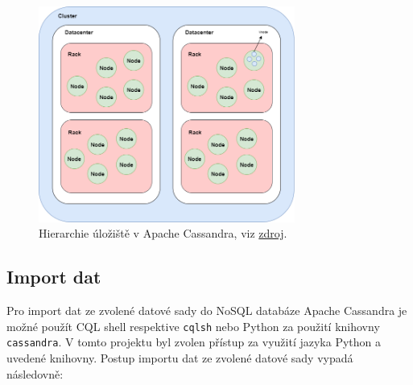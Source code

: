 \documentclass[a4paper, 11pt]{article}
\begin{document}
    \begin{figure}[ht!]
        \centering
        \includegraphics[width=0.75\textwidth]{img/cassandra_hierarchy.jpg}
        \caption{Hierarchie úložiště v Apache Cassandra, viz \href{https://www.baeldung.com/cassandra-cluster-datacenters-racks-nodes}{zdroj}.}
        \label{CassandraHier}
    \end{figure}
    
    \subsection{Import dat}
        Pro import dat ze zvolené datové sady do NoSQL databáze Apache Cassandra je možné použít CQL shell respektive \texttt{cqlsh} nebo Python za použití knihovny \texttt{cassandra}. V tomto projektu byl zvolen přístup za využití jazyka Python a uvedené knihovny. Postup importu dat ze zvolené datové sady vypadá následovně:
\end{document}
